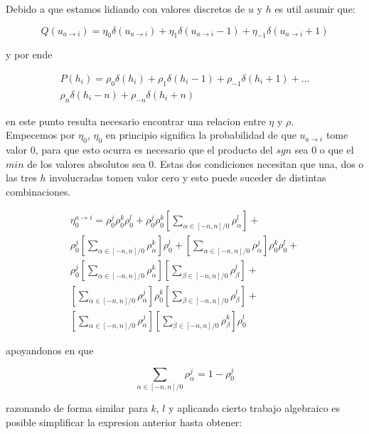 \documentclass[11pt]{amsart}
\theoremstyle{definition} \newtheorem{defi}{Definition}
\begin{document}
	Debido a que estamos lidiando con valores discretos de $u$ y $h$ es util asumir que:

	\begin{equation}
	Q(u_{a \to i}) = \eta_0 \delta(u_{a \to i}) + 
	\eta_1 \delta(u_{a \to i}-1) + 
	\eta_{-1} \delta(u_{a 	\to i} + 1)
	\end{equation}
	
	y por ende
	
	\begin{multline}
	P(h_i) = \rho_0 \delta(h_i) + \rho_1 \delta(h_i - 1) + 
	\rho_{-1} \delta(h_i + 1) + ...
	\\
	\rho_n \delta(h_i - n) + \rho_{-n} \delta(h_i + n)
	\end{multline} 
	
	en este punto resulta necesario encontrar una relacion entre $\eta$ y $\rho$. 
	\\
	Empecemos por $\eta_0$,
	$\eta_0$ en principio significa la probabilidad de que $u_{a \to i}$ 
	tome valor $0$, para que esto ocurra es necesario que el producto del 
	$sgn$ sea $0$ o que el $min$ de los valores absolutos sea $0$. Estas 
	dos condiciones necesitan que una, dos o las tres $h$ involucradas tomen 
	valor cero y esto puede suceder de distintas combinaciones.

	\begin{multline}
	\eta_0^{a \to i} = \rho_0^j \rho_0^k \rho_0^l + 
	\rho_0^j \rho_0^k [\sum_{\alpha \in [-n, n] / 0} \rho_{\alpha}^l]+
	\\
	\rho_0^j [\sum_{\alpha \in [-n, n] / 0} \rho_{\alpha}^k] \rho_0^l+
	[\sum_{\alpha \in [-n, n] / 0} \rho_{\alpha}^j] \rho_0^k \rho_0^l+
	\\
	\rho_0^j[\sum_{\alpha \in [-n, n] / 0} \rho_{\alpha}^k][\sum_{\beta \in [-n, n] / 0} \rho_{\beta}^l]+
	\\
	[\sum_{\alpha \in [-n, n] / 0} \rho_{\alpha}^j] \rho_0^k [\sum_{\beta \in [-n, n] / 0} \rho_{\beta}^l]+
	\\
	[\sum_{\alpha \in [-n, n] / 0} \rho_{\alpha}^j][\sum_{\beta \in [-n, n] / 0} \rho_{\beta}^k]	\rho_0^l
	\end{multline} 

	apoyandonos en que
	
	\begin{equation}
	\sum_{\alpha \in [-n, n] / 0} \rho_{\alpha}^j = 1-\rho_0^j
	\end{equation}
	
	razonando de forma similar para $k$, $l$  y aplicando cierto trabajo algebraico es 
	posible simplificar la expresion anterior hasta obtener:
\end{document}
